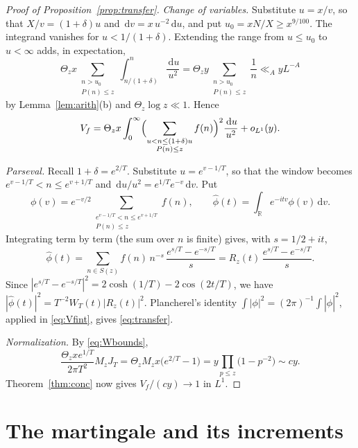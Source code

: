 \documentclass[11pt]{amsart}
\theoremstyle{remark}
\numberwithin{equation}{section}
\newcommand{\R}{\mathbb{R}}
\newcommand{\dd}{\,\mathrm{d}}
\begin{document}
\begin{proof}[Proof of Proposition~\ref{prop:transfer}]
\emph{Change of variables.} Substitute $u=x/v$, so that $X/v=(1+\delta)u$ and $\dd v=x\,u^{-2}\dd u$, and put $u_0=xN/X\ge x^{9/100}$. The integrand vanishes for $u<1/(1+\delta)$. Extending the range from $u\le u_0$ to $u<\infty$ adds, in expectation,
\[
\Theta_zx\sum_{\substack{n>u_0\\ P(n)\le z}}\int_{n/(1+\delta)}^{n}\frac{\dd u}{u^2}=\Theta_zy\sum_{\substack{n>u_0\\ P(n)\le z}}\frac1n\ll_AyL^{-A}
\]
by Lemma~\ref{lem:arith}(b) and $\Theta_z\log z\ll1$. Hence
\begin{equation}\label{eq:Vfint}
V_f=\Theta_zx\int_0^\infty\Bigl(\sum_{\substack{u<n\le(1+\delta)u\\ P(n)\le z}}f(n)\Bigr)^2\frac{\dd u}{u^2}+o_{L^1}(y).
\end{equation}

\emph{Parseval.} Recall $1+\delta=e^{2/T}$. Substitute $u=e^{v-1/T}$, so that the window becomes $e^{v-1/T}<n\le e^{v+1/T}$ and $\dd u/u^2=e^{1/T}e^{-v}\dd v$. Put
\[
\phi(v)=e^{-v/2}\sum_{\substack{e^{v-1/T}<n\le e^{v+1/T}\\ P(n)\le z}}f(n),\qquad\widehat\phi(t)=\int_\R e^{-itv}\phi(v)\dd v .
\]
Integrating term by term (the sum over $n$ is finite) gives, with $s=1/2+it$,
\[
\widehat\phi(t)=\sum_{n\in S(z)}f(n)\,n^{-s}\,\frac{e^{s/T}-e^{-s/T}}{s}=R_z(t)\,\frac{e^{s/T}-e^{-s/T}}{s}.
\]
Since $|e^{s/T}-e^{-s/T}|^2=2\cosh(1/T)-2\cos(2t/T)$, we have $|\widehat\phi(t)|^2=T^{-2}W_T(t)|R_z(t)|^2$. Plancherel's identity $\int|\phi|^2=(2\pi)^{-1}\int|\widehat\phi|^2$, applied in \eqref{eq:Vfint}, gives \eqref{eq:transfer}.

\emph{Normalization.} By \eqref{eq:Wbounds},
\[
\frac{\Theta_zxe^{1/T}}{2\pi T^2}M_zJ_T=\Theta_zM_zx\bigl(e^{2/T}-1\bigr)=y\prod_{p\le z}\bigl(1-p^{-2}\bigr)\sim cy .
\]
Theorem~\ref{thm:conc} now gives $V_f/(cy)\to1$ in $L^1$.
\end{proof}

\section{The martingale and its increments}\label{sec:mart}
\end{document}
